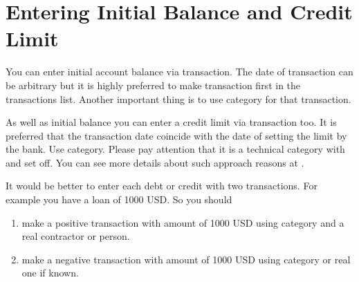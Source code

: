 \documentclass[a4paper,10pt,english]{sphinxmanual}
\begin{document}
\section{Entering Initial Balance and Credit Limit}
\label{\detokenize{getting-started:entering-initial-balance-and-credit-limit}}
\sphinxAtStartPar
You can enter initial account balance via transaction. The date of transaction can be arbitrary but it is
highly preferred to make transaction first in the transactions list.
Another important thing is to use category  for that transaction.

\noindent{}

\noindent{}

\sphinxAtStartPar
As well as initial balance you can enter a credit limit via transaction too. It is preferred that the transaction date coincide with the date of setting the limit by the bank.
Use  category. Please pay attention that it is a technical category with
 and  set off. You can see more details about such approach reasons
at .

\noindent{}

\noindent{}

\sphinxAtStartPar
It would be better to enter each debt or credit with two transactions. For example you have a loan of 1000 USD. So you should
\begin{enumerate}
%
\item {} 
\sphinxAtStartPar
make a positive transaction with amount of 1000 USD using category  and a real contractor or person.

\item {} 
\sphinxAtStartPar
make a negative transaction with amount of 1000 USD using category  or real one if known.

\end{enumerate}
\end{document}
